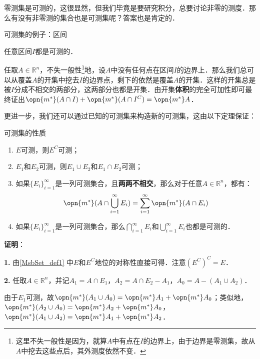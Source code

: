 零测集是可测的，这很显然，但我们毕竟是要研究积分，总要讨论非零的测度．那么有没有非零测的集合也是可测集呢？答案也是肯定的．

\begin{example}{可测集的例子：区间}\label{MsbSet_ex1}

任意区间$I$都是可测的．

任取$A\in\mathbb{R}^n$，不失一般性\footnote{这里不失一般性是因为，就算$A$中有点在$I$的边界上，由于边界是零测集，故从$A$中挖去这些点后，其外测度依然不变．}地，设$A$中没有任何点在区间$I$的边界上．那么我们总可以从覆盖$A$的开集中挖去$I$的边界点，剩下的依然是覆盖$A$的开集．这样的开集总是被$I$分成不相交的两部分，这两部分也都是开集．由开集\textbf{体积}的完全可加性即可最终证出$\opn{m^*}(A\cap I)+\opn{m^*}(A\cap I^C)=\opn{m^*}A$．

\end{example}

更进一步，我们还可以通过已知的可测集来构造新的可测集，这由以下定理保证：

\begin{theorem}{可测集的性质}\label{MsbSet_the1}

\begin{enumerate}
\item $E$可测，则$E^C$可测；
\item $E_1$和$E_2$可测，则$E_1\cup E_2$和$E_1\cap E_2$可测；
\item 如果$\{E_i\}_{i=1}^{\infty}$是一列可测集合，且\textbf{两两不相交}，那么对于任意$A\in\mathbb{R}^n$，都有：
\begin{equation}\label{MsbSet_eq4}
\opn{m^*}(A\cap \bigcup_{i=1}^{\infty}E_i)=\sum_{i=1}^{\infty}\opn{m^*}(A\cap E_i)
\end{equation}
\item 如果$\{E_i\}_{i=1}^{\infty}$是一列可测集合，那么$\bigcap_{i=1}^{\infty}E_i$和$\bigcup_{i=1}^{\infty}E_i$也都是可测的．
\end{enumerate}

\end{theorem}

\textbf{证明}：


\textbf{1.} 由\autoref{MsbSet_def1} 中$E$和$E^C$地位的对称性直接可得．注意$(E^C)^C=E$．

\textbf{2.} 任取$A\in\mathbb{R}^n$，并记$A_1=A\cap E_1$，$A_2=A\cap E_2-A_1$，$A_0=A-(A_1\cup A_2)$．


由于$E_1$可测，故$\opn{m^*}(A_1\cup A_0)=\opn{m^*}A_1+\opn{m^*}A_0$；类似地，$\opn{m^*}(A_2\cup A_0)=\opn{m^*}A_2+\opn{m^*}A_0$，$\opn{m^*}(A_1\cup A_2)=\opn{m^*}A_1+\opn{m^*}A_2$．

